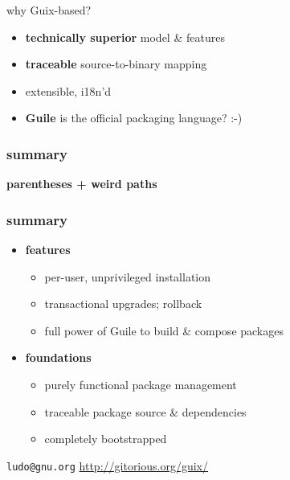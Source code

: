 \documentclass{beamer}
\begin{document}
\begin{frame}{why Guix-based?}
  \begin{itemize}
    \item \textbf{technically superior} model \& features
    \item \textbf{traceable} source-to-binary mapping
    \item extensible, i18n'd
    \item<2-> \textbf{Guile} is the official packaging language? :-)
  \end{itemize}
\end{frame}

\begin{frame}
  \frametitle{summary}

  \bf \huge{parentheses + weird paths}
\end{frame}

\begin{frame}
  \frametitle{summary}

  \begin{itemize}
  \item \textbf{features}
    \begin{itemize}
    \item per-user, unprivileged installation
    \item transactional upgrades; rollback
    \item full power of Guile to build \& compose packages
    \end{itemize}
  \item \textbf{foundations}
    \begin{itemize}
    \item purely functional package management
    \item traceable package source \& dependencies
    \item completely bootstrapped
    \end{itemize}
  \end{itemize}
\end{frame}

\begin{frame}{}

\vfill{
  \vspace{7cm}
  \texttt{ludo@gnu.org} \hfill{\alert{\url{http://gitorious.org/guix/}}}
}

\end{frame}
\end{document}
